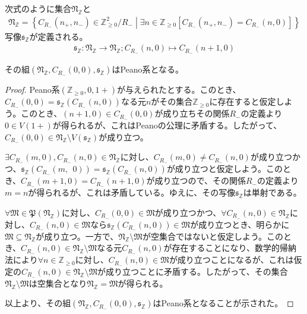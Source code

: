 \documentclass[dvipdfmx]{jsarticle}
\begin{document}
\begin{dfn}
次式のように集合$\mathfrak{N}_{\mathbb{Z}}$と
\begin{align*}
\mathfrak{N}_{\mathbb{Z}} = \left\{ C_{R_{-}}\left( n_{+},n_{-} \right) \in \mathbb{Z}_{\geq 0}^{2} /R_{-}  \middle| \exists n \in \mathbb{Z}_{\geq 0}\left[ C_{R_{-}}\left( n_{+},n_{-} \right) = C_{R_{-}}(n,0) \right] \right\}
\end{align*}
写像$\mathfrak{s}_{\mathbb{Z}}$が定義される。
\begin{align*}
\mathfrak{s}_{\mathbb{Z}}:\mathfrak{N}_{\mathbb{Z}} \rightarrow \mathfrak{N}_{\mathbb{Z}};C_{R_{-}}(n,0) \mapsto C_{R_{-}}(n + 1,0)
\end{align*}
\end{dfn}
\begin{thm}\label{1.2.6.3}
その組$\left( \mathfrak{N}_{\mathbb{Z}},C_{R_{-}}(0,0),\mathfrak{s}_{\mathbb{Z}} \right)$はPeano系となる。
\end{thm}
\begin{proof}
Peano系$\left( \mathbb{Z}_{\geq 0},0,1 + \right)$が与えられたとする。このとき、$C_{R_{-}}(0,0) = \mathfrak{s}_{\mathbb{Z}}\left( C_{R_{-}}(n,0) \right)$なる元$n$がその集合$\mathbb{Z}_{\geq 0}$に存在すると仮定しよう。このとき、$(n + 1,0) \in C_{R_{-}}(0,0)$が成り立ちその関係$R_{-}$の定義より$0 \in V(1 + )$が得られるが、これはPeanoの公理に矛盾する。したがって、$C_{R_{-}}(0,0) \in \mathfrak{N}_{\mathbb{Z}} \setminus V\left( \mathfrak{s}_{\mathbb{Z}} \right)$が成り立つ。\par
$\exists C_{R_{-}}(m,0),C_{R_{-}}(n,0) \in \mathfrak{N}_{\mathbb{Z}}$に対し、$C_{R_{-}}(m,0) \neq C_{R_{-}}(n,0)$が成り立つかつ、$\mathfrak{s}_{\mathbb{Z}}\left( C_{R_{-}}(m,\ \ 0) \right) = \mathfrak{s}_{\mathbb{Z}}\left( C_{R_{-}}(n,0) \right)$が成り立つと仮定しよう。このとき、$C_{R_{-}}(m + 1,0) = C_{R_{-}}(n + 1,0)$が成り立つので、その関係$R_{-}$の定義より$m = n$が得られるが、これは矛盾している。ゆえに、その写像$\mathfrak{s}_{\mathbb{Z}}$は単射である。\par
$\mathfrak{\forall M \in P}\left( \mathfrak{N}_{\mathbb{Z}} \right)$に対し、$C_{R_{-}}(0,0)\in \mathfrak{M}$が成り立つかつ、$\forall C_{R_{-}}(n,0) \in \mathfrak{N}_{\mathbb{Z}}$に対し、$C_{R_{-}}(n,0)\in \mathfrak{M}$なら$\mathfrak{s}_{\mathbb{Z}}\left( C_{R_{-}}(n,0) \right)\in \mathfrak{M}$が成り立つとき、明らかに$\mathfrak{M \subseteq}\mathfrak{N}_{\mathbb{Z}}$が成り立つ。一方で、$\mathfrak{N}_{\mathbb{Z}}\mathfrak{\setminus M}$が空集合ではないと仮定しよう。このとき、$C_{R_{-}}(n,0) \in \mathfrak{N}_{\mathbb{Z}}\mathfrak{\setminus M}$なる元$C_{R_{-}}(n,0)$が存在することになり、数学的帰納法により$\forall n \in \mathbb{Z}_{\geq 0}$に対し、$C_{R_{-}}(n,0)\in \mathfrak{M}$が成り立つことになるが、これは仮定の$C_{R_{-}}(n,0) \in \mathfrak{N}_{\mathbb{Z}}\mathfrak{\setminus M}$が成り立つことに矛盾する。したがって、その集合$\mathfrak{N}_{\mathbb{Z}}\mathfrak{\setminus M}$は空集合となり$\mathfrak{N}_{\mathbb{Z}} = \mathfrak{M}$が得られる。\par
以上より、その組$\left( \mathfrak{N}_{\mathbb{Z}},C_{R_{-}}(0,0),\mathfrak{s}_{\mathbb{Z}} \right)$はPeano系となることが示された。
\end{proof}
\end{document}
